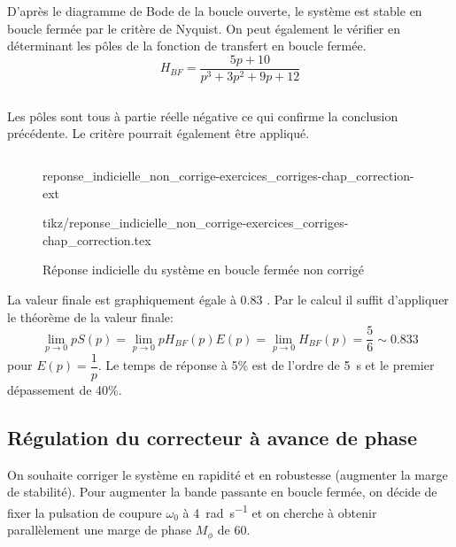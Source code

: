 D'après le diagramme de Bode de la boucle ouverte, le système est stable 
en boucle fermée par le critère de Nyquist. On peut également le vérifier 
en déterminant les pôles de la fonction de transfert en boucle fermée.
\[
    H_{BF}=\dfrac{5p+10}{p^3+3p^2+9p+12}
\]
\inputminted{scilab}{codes/scilab/code_q3_chap_correction.sce}
Les pôles sont tous à partie réelle négative ce qui confirme la conclusion 
précédente. Le critère pourrait également être appliqué.
\inputminted{scilab}{codes/scilab/code_q4_chap_correction.sce}
\begin{figure}
    \centering
    {reponse_indicielle_non_corrige-exercices_corriges-chap_correction-ext}
    
    {tikz/reponse_indicielle_non_corrige-exercices_corriges-chap_correction.tex}
    \caption{Réponse indicielle du système en boucle fermée non corrigé}
\end{figure}
La valeur finale est graphiquement égale à 0.83 .
Par le calcul il suffit d'appliquer le théorème de la valeur finale:
\[
    \lim\limits_{p\to0} pS(p)=
    \lim\limits_{p\to0} pH_{BF}(p)E(p)=
    \lim\limits_{p\to0} H_{BF}(p)=\dfrac{5}{6}\sim0.833
\]
pour $E(p)=\dfrac{1}{p}$.
Le temps de réponse à 5\% est de l'ordre de \SI{5}{\second} et le premier 
dépassement de 40\%.
\subsection*{Régulation du correcteur à avance de phase}
On souhaite corriger le système en rapidité et en robustesse (augmenter la 
marge de stabilité). Pour augmenter la bande passante en boucle fermée, on 
décide de fixer la pulsation de coupure $\omega_0$ à 
\SI{4}{\radian\per\second} et on cherche à obtenir parallèlement une marge 
de phase $M_\phi$ de \SI{60}{\degreeSI}.

